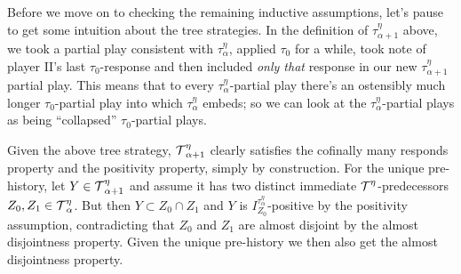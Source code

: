 \documentclass[../../main]{subfiles}
\begin{document}
{  \qquad Before we move on to checking the remaining inductive assumptions, let's pause to get some intuition about the tree strategies. In the definition of $\tau^\eta_{\alpha+1}$ above, we took a partial play consistent with $\tau^\eta_\alpha$, applied $\tau_0$ for a while, took note of player II's last $\tau_0$-response and then included \textit{only that} response in our new $\tau^\eta_{\alpha+1}$ partial play. This means that to every $\tau^\eta_\alpha$-partial play there's an ostensibly much longer $\tau_0$-partial play into which $\tau^\eta_\alpha$ embeds; so we can look at the $\tau^\eta_\alpha$-partial plays as being ``collapsed'' $\tau_0$-partial plays.

	\qquad  Given the above tree strategy, $\operatorname{\mathcal T}^\eta_{\alpha+1}$ clearly satisfies the cofinally many responds property and the positivity property, simply by construction. For the unique pre-history, let $Y\in\operatorname{\mathcal T}^\eta_{\alpha+1}$ and assume it has two distinct immediate $\operatorname{\mathcal T}^\eta$-predecessors $Z_0,Z_1\in\operatorname{\mathcal T}^\eta_\alpha$. But then $Y\subset Z_0\cap Z_1$ and $Y$ is $I_{Z_0}^{\tau^\eta_\alpha}$-positive by the positivity assumption, contradicting that $Z_0$ and $Z_1$ are almost disjoint by the almost disjointness property. Given the unique pre-history we then also get the almost disjointness property.


 
}
\end{document}
